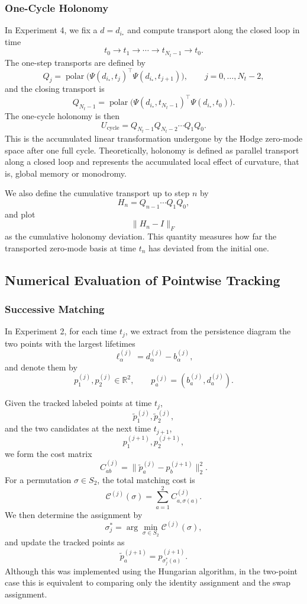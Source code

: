\documentclass[pdflatex,sn-mathphys-num]{sn-jnl}%
\theoremstyle{thmstyleone}%
\theoremstyle{thmstyletwo}%
\theoremstyle{thmstylethree}%
\begin{document}
\begin{appendices}
\subsubsection{One-Cycle Holonomy}

In Experiment 4, we fix a \(d=d_{i_\ast}\) and compute transport along the closed loop in time
\[
t_0\to t_1\to \cdots \to t_{N_t-1}\to t_0.
\]
The one-step transports are defined by
\[
Q_j
=
\operatorname{polar}
\bigl(
\Psi(d_{i_\ast},t_j)^\top \Psi(d_{i_\ast},t_{j+1})
\bigr),
\qquad
j=0,\dots,N_t-2,
\]
and the closing transport is
\[
Q_{N_t-1}
=
\operatorname{polar}
\bigl(
\Psi(d_{i_\ast},t_{N_t-1})^\top \Psi(d_{i_\ast},t_0)
\bigr).
\]
The one-cycle holonomy is then
\[
U_{\mathrm{cycle}}
=
Q_{N_t-1}Q_{N_t-2}\cdots Q_1Q_0.
\]
This is the accumulated linear transformation undergone by the Hodge zero-mode space after one full cycle. Theoretically, holonomy is defined as parallel transport along a closed loop and represents the accumulated local effect of curvature, that is, global memory or monodromy.

We also define the cumulative transport up to step \(n\) by
\[
H_n
=
Q_{n-1}\cdots Q_1Q_0,
\]
and plot
\[
\|H_n-I\|_F
\]
as the cumulative holonomy deviation. This quantity measures how far the transported zero-mode basis at time \(t_n\) has deviated from the initial one.

\subsection{Numerical Evaluation of Pointwise Tracking}

\subsubsection{Successive Matching}

In Experiment 2, for each time \(t_j\), we extract from the persistence diagram the two points with the largest lifetimes
\[
\ell_\alpha^{(j)} = d_\alpha^{(j)}-b_\alpha^{(j)},
\]
and denote them by
\[
p_1^{(j)},p_2^{(j)}\in \mathbb{R}^2,
\qquad
p_a^{(j)}=(b_a^{(j)},d_a^{(j)}).
\]

Given the tracked labeled points at time \(t_j\),
\[
\widetilde p_1^{(j)},\widetilde p_2^{(j)},
\]
and the two candidates at the next time \(t_{j+1}\),
\[
p_1^{(j+1)},p_2^{(j+1)},
\]
we form the cost matrix
\[
C_{ab}^{(j)}
=
\bigl\|
\widetilde p_a^{(j)}-p_b^{(j+1)}
\bigr\|_2^2.
\]
For a permutation \(\sigma\in S_2\), the total matching cost is
\[
\mathcal C^{(j)}(\sigma)
=
\sum_{a=1}^2 C_{a,\sigma(a)}^{(j)}.
\]
We then determine the assignment by
\[
\sigma_j^\ast
=
\arg\min_{\sigma\in S_2}\mathcal C^{(j)}(\sigma),
\]
and update the tracked points as
\[
\widetilde p_a^{(j+1)}
=
p_{\sigma_j^\ast(a)}^{(j+1)}.
\]
Although this was implemented using the Hungarian algorithm, in the two-point case this is equivalent to comparing only the identity assignment and the swap assignment.


\end{appendices}
\end{document}
